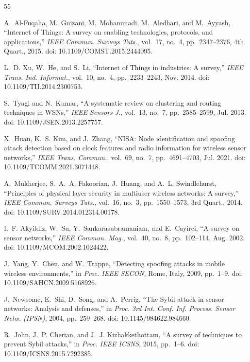 \documentclass[conference]{IEEEtran}
\begin{document}
\begin{thebibliography}{55}

A.~Al-Fuqaha, M.~Guizani, M.~Mohammadi, M.~Aledhari, and M.~Ayyash, ``Internet of Things: A survey on enabling technologies, protocols, and applications,'' \textit{IEEE Commun. Surveys Tuts.}, vol.~17, no.~4, pp.~2347--2376, 4th Quart., 2015. doi: 10.1109/COMST.2015.2444095.

L.~D. Xu, W.~He, and S.~Li, ``Internet of Things in industries: A survey,'' \textit{IEEE Trans. Ind. Informat.}, vol.~10, no.~4, pp.~2233--2243, Nov. 2014. doi: 10.1109/TII.2014.2300753.

S.~Tyagi and N.~Kumar, ``A systematic review on clustering and routing techniques in WSNs,'' \textit{IEEE Sensors J.}, vol.~13, no.~7, pp.~2585--2599, Jul. 2013. doi: 10.1109/JSEN.2013.2257757.

X.~Huan, K.~S. Kim, and J.~Zhang, ``NISA: Node identification and spoofing attack detection based on clock features and radio information for wireless sensor networks,'' \textit{IEEE Trans. Commun.}, vol.~69, no.~7, pp.~4691--4703, Jul. 2021. doi: 10.1109/TCOMM.2021.3071448.

A.~Mukherjee, S.~A.~A. Fakoorian, J.~Huang, and A.~L. Swindlehurst, ``Principles of physical layer security in multiuser wireless networks: A survey,'' \textit{IEEE Commun. Surveys Tuts.}, vol.~16, no.~3, pp.~1550--1573, 3rd Quart., 2014. doi: 10.1109/SURV.2014.012314.00178.

I.~F. Akyildiz, W.~Su, Y.~Sankarasubramaniam, and E.~Cayirci, ``A survey on sensor networks,'' \textit{IEEE Commun. Mag.}, vol.~40, no.~8, pp.~102--114, Aug. 2002. doi: 10.1109/MCOM.2002.1024422.

J.~Yang, Y.~Chen, and W.~Trappe, ``Detecting spoofing attacks in mobile wireless environments,'' in \textit{Proc. IEEE SECON}, Rome, Italy, 2009, pp.~1--9. doi: 10.1109/SAHCN.2009.5168926.

J.~Newsome, E.~Shi, D.~Song, and A.~Perrig, ``The Sybil attack in sensor networks: Analysis and defenses,'' in \textit{Proc. 3rd Int. Conf. Inf. Process. Sensor Netw. (IPSN)}, 2004, pp.~259--268. doi: 10.1145/984622.984660.

R.~John, J.~P. Cherian, and J.~J. Kizhakkethottam, ``A survey of techniques to prevent Sybil attacks,'' in \textit{Proc. IEEE ICSNS}, 2015, pp.~1--6. doi: 10.1109/ICSNS.2015.7292385.


\end{thebibliography}
\end{document}
